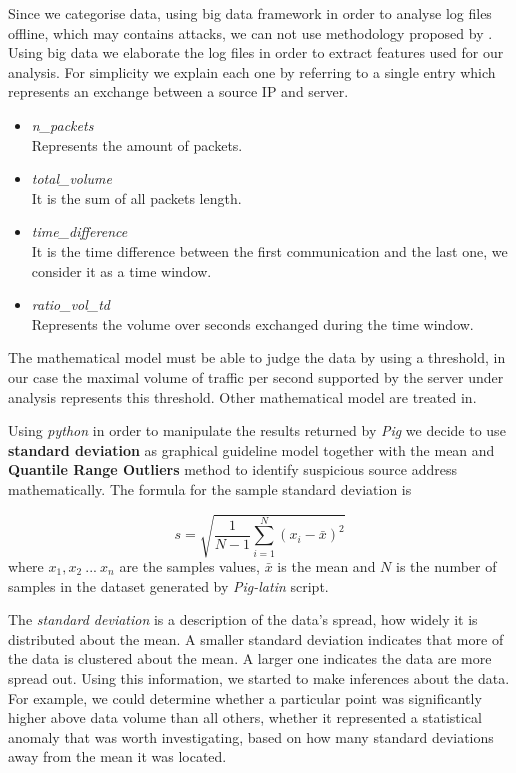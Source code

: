 Since we categorise data, using big data framework in order to analyse log files offline, which may contains attacks, we can not use methodology proposed by \cite{detection_by_path_analaysis}. Using big data we elaborate the log files in order to extract features used for our analysis. For simplicity we explain each one by referring to a single entry which represents an exchange between a source IP and server.

\begin{itemize}
	\item \textit{n\_packets} \\ Represents the amount of packets.
	\item \textit{total\_volume} \\ It is the sum of all packets length.
	\item \textit{time\_difference} \\ It is the time difference between the first communication and the last one, we consider it as a time window.
	\item \textit{ratio\_vol\_td} \\ Represents the volume over seconds exchanged during the time window.
\end{itemize}

The mathematical model must be able to judge the data by using a threshold, in our case the maximal volume of traffic per second supported by the server under analysis represents this threshold. Other mathematical model are treated in\cite{detection_by_path_analaysis}. 

Using \textit{python} in order to manipulate the results returned by \textit{Pig} we decide to use \textbf{standard deviation} as graphical guideline model together with the mean and  \textbf{Quantile Range Outliers} method to identify suspicious source address mathematically.
The formula for the sample standard deviation is

\begin{equation}
\label{eq:standard_dev}
	s = \sqrt{\frac{1}{N-1}\sum_{i=1}^N(x_i - \bar{x})^2}
\end{equation}
where $x_1, x_2\ ...\ x_n$ are the samples values, $\bar{x}$ is the mean and $N$ is the number of samples in the dataset generated by \textit{Pig-latin} script.

The \textit{standard deviation} is a description of the data's spread, how widely it is distributed about the mean.  
A smaller standard deviation indicates that more of the data is clustered about the mean.  
A larger one indicates the data are more spread out.
Using this information, we started to make inferences about the data.  
For example, we could determine whether a particular point was significantly higher above data volume than all others,  whether it represented a statistical anomaly that was worth investigating, based on how many standard deviations away from the mean it was located.

